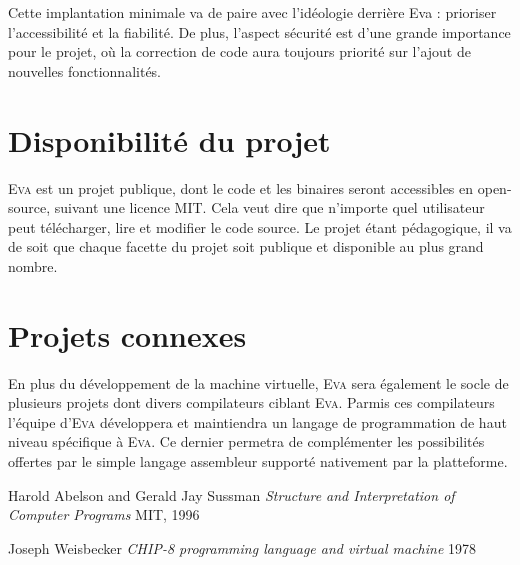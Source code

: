 \documentclass[11pt,twoside,french]{article}
\newcommand{\noun}[1]{\textsc{#1}}
\newcommand{\noun}[1]{\textsc{#1}}
\begin{document}
Cette implantation minimale va de paire avec l'idéologie derrière
Eva : prioriser l'accessibilité et la fiabilité. De plus, l'aspect
sécurité est d'une grande importance pour le projet, où la correction
de code aura toujours priorité sur l'ajout de nouvelles fonctionnalités.

\section{Disponibilité du projet}

\noun{Eva} est un projet publique, dont le code et les binaires seront
accessibles en open-source, suivant une licence MIT. Cela veut dire
que n'importe quel utilisateur peut télécharger, lire et modifier
le code source. Le projet étant pédagogique, il va de soit que chaque
facette du projet soit publique et disponible au plus grand nombre.

\section{Projets connexes}

En plus du développement de la machine virtuelle, \noun{Eva} sera
également le socle de plusieurs projets dont divers compilateurs ciblant
\noun{Eva}. Parmis ces compilateurs l'équipe d'\noun{Eva} développera et maintiendra
un langage de programmation de haut niveau spécifique à \noun{Eva}. Ce dernier
permetra de complémenter les possibilités offertes par le simple langage
assembleur supporté nativement par la platteforme.


\newpage{}

\begin{thebibliography}{XXXXXX}
\label{chap:bib}

 Harold Abelson and Gerald Jay Sussman
\emph{Structure and Interpretation of Computer Programs} MIT, 1996

 Joseph Weisbecker
\emph{CHIP-8 programming language and virtual machine} 1978

\end{thebibliography}
\end{document}
